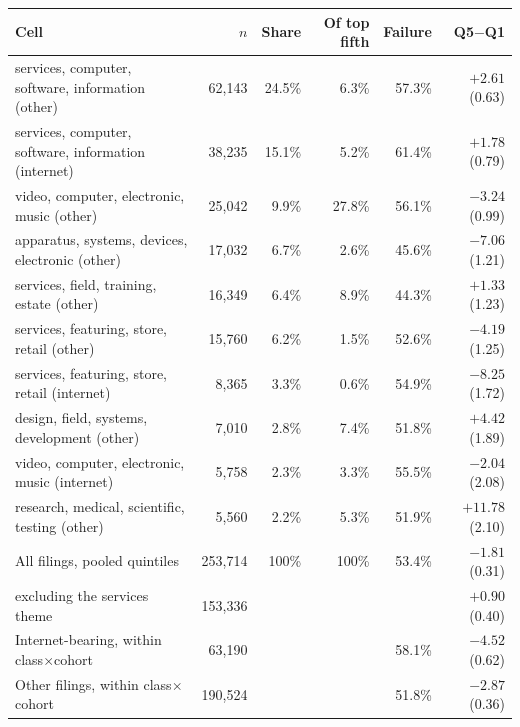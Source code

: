 \begin{tabular}{p{5.6cm}rrrrr}
\toprule
Cell & $n$ & Share & Of top fifth & Failure & Q5$-$Q1 \\
\midrule
services, computer, software, information (other) & 62,143 & 24.5\% & 6.3\% & 57.3\% & $+2.61$ (0.63) \\
services, computer, software, information (internet) & 38,235 & 15.1\% & 5.2\% & 61.4\% & $+1.78$ (0.79) \\
video, computer, electronic, music (other) & 25,042 & 9.9\% & 27.8\% & 56.1\% & $-3.24$ (0.99) \\
apparatus, systems, devices, electronic (other) & 17,032 & 6.7\% & 2.6\% & 45.6\% & $-7.06$ (1.21) \\
services, field, training, estate (other) & 16,349 & 6.4\% & 8.9\% & 44.3\% & $+1.33$ (1.23) \\
services, featuring, store, retail (other) & 15,760 & 6.2\% & 1.5\% & 52.6\% & $-4.19$ (1.25) \\
services, featuring, store, retail (internet) & 8,365 & 3.3\% & 0.6\% & 54.9\% & $-8.25$ (1.72) \\
design, field, systems, development (other) & 7,010 & 2.8\% & 7.4\% & 51.8\% & $+4.42$ (1.89) \\
video, computer, electronic, music (internet) & 5,758 & 2.3\% & 3.3\% & 55.5\% & $-2.04$ (2.08) \\
research, medical, scientific, testing (other) & 5,560 & 2.2\% & 5.3\% & 51.9\% & $+11.78$ (2.10) \\
\midrule
All filings, pooled quintiles & 253,714 & 100\% & 100\% & 53.4\% & $-1.81$ (0.31) \\
\quad excluding the services theme & 153,336 & & & & $+0.90$ (0.40) \\
Internet-bearing, within class$\times$cohort & 63,190 & & & 58.1\% & $-4.52$ (0.62) \\
Other filings, within class$\times$cohort & 190,524 & & & 51.8\% & $-2.87$ (0.36) \\
\bottomrule
\end{tabular}
